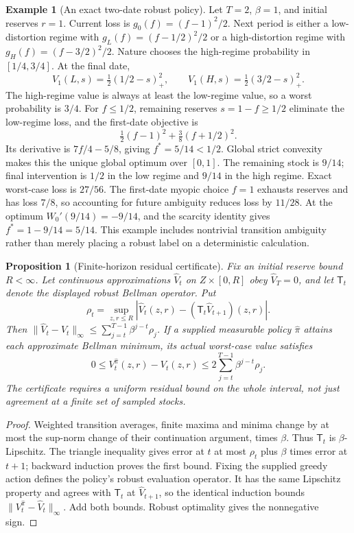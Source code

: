 \documentclass[11pt]{article}
\newtheorem{proposition}{Proposition}
\theoremstyle{definition}
\newtheorem{example}{Example}
\begin{document}
\begin{example}[An exact two-date robust policy]
Let $T=2$, $\beta=1$, and initial reserves $r=1$. Current loss is
$g_0(f)=(f-1)^2/2$. Next period is either a low-distortion regime with
$g_L(f)=(f-1/2)^2/2$ or a high-distortion regime with
$g_H(f)=(f-3/2)^2/2$. Nature chooses the high-regime probability in
$[1/4,3/4]$. At the final date,
\[
 V_1(L,s)=\tfrac12(1/2-s)_+^2,\qquad
 V_1(H,s)=\tfrac12(3/2-s)_+^2.
\]
The high-regime value is always at least the low-regime value, so a
worst probability is $3/4$. For $f\leq1/2$, remaining reserves
$s=1-f\geq1/2$ eliminate the low-regime loss, and the first-date objective is
\[
 \tfrac12(f-1)^2+\tfrac38(f+1/2)^2.
\]
Its derivative is $7f/4-5/8$, giving $f^*=5/14<1/2$.
Global strict convexity makes this the unique global optimum over $[0,1]$.
The remaining stock is $9/14$; final intervention is $1/2$ in the low
regime and $9/14$ in the high regime. Exact worst-case loss is $27/56$.
The first-date myopic choice $f=1$ exhausts reserves and has loss $7/8$,
so accounting for future ambiguity reduces loss by $11/28$.
At the optimum $W_0'(9/14)=-9/14$, and the scarcity identity gives
$f^*=1-9/14=5/14$. This example includes nontrivial transition ambiguity
rather than merely placing a robust label on a deterministic calculation.
\end{example}

\begin{proposition}[Finite-horizon residual certificate]
Fix an initial reserve bound $R<\infty$. Let continuous approximations
$\widehat V_t$ on $Z\times[0,R]$ obey $\widehat V_T=0$, and let
$\mathsf T_t$ denote the displayed robust Bellman operator. Put
\[
 \rho_t=\sup_{z,r\leq R}
   |\widehat V_t(z,r)-(\mathsf T_t\widehat V_{t+1})(z,r)|.
\]
Then $\|\widehat V_t-V_t\|_\infty\leq
\sum_{j=t}^{T-1}\beta^{j-t}\rho_j$. If a supplied measurable policy
$\widehat\pi$ attains each approximate Bellman minimum, its actual
worst-case value satisfies
\[
 0\leq V_t^{\widehat\pi}(z,r)-V_t(z,r)
       \leq2\sum_{j=t}^{T-1}\beta^{j-t}\rho_j.
\]
The certificate requires a uniform residual bound on the whole interval,
not just agreement at a finite set of sampled stocks.
\end{proposition}
\begin{proof}
Weighted transition averages, finite maxima and minima change by at most
the sup-norm change of their continuation argument, times $\beta$.
Thus $\mathsf T_t$ is $\beta$-Lipschitz. The triangle inequality gives
error at $t$ at most $\rho_t$ plus $\beta$ times error at $t+1$;
backward induction proves the first bound. Fixing the supplied greedy
action defines the policy's robust evaluation operator. It has the same
Lipschitz property and agrees with $\mathsf T_t$ at
$\widehat V_{t+1}$, so the identical induction bounds
$\|V_t^{\widehat\pi}-\widehat V_t\|_\infty$. Add both bounds.
Robust optimality gives the nonnegative sign.
\end{proof}
\end{document}
